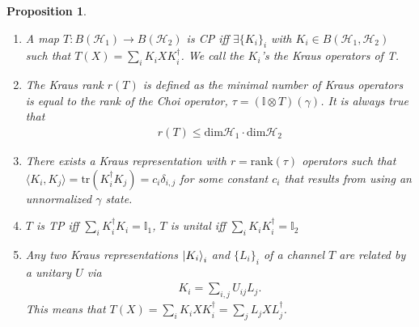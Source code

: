 \documentclass[10pt,oneside,longbibliography]{report}
\newtheorem{proposition}{Proposition}[section]
\begin{document}
\begin{proposition}
\begin{enumerate}
    \item A map $T:B(\mathcal{H}_1)\rightarrow B(\mathcal{H}_2)$ is CP iff $\exists \{K_i\}_i$ with $K_i \in B(\mathcal{H}_1,\mathcal{H}_2)$ such that $T(X) = \sum_i K_i X K_i^{\dagger}$. We call the $K_i$'s the Kraus operators of T. 
    \item The Kraus rank $r(T)$ is defined as the minimal number of Kraus operators is equal to the rank of the Choi operator, $\tau = (\mathbb{I}\otimes T)(\gamma)$. It is always true that 
    \begin{align}
        r(T) \leq \text{dim}\mathcal{H}_1\cdot\text{dim}\mathcal{H}_2
    \end{align}
    \item There exists a Kraus representation with $r=\text{rank}(\tau)$ operators such that $\langle K_i,K_j\rangle=\text{tr}(K_i^{\dagger} K_j) = c_i \delta_{i,j}$ for some constant $c_i$ that results from using an unnormalized $\gamma$ state. 
    \item $T$ is TP iff $\sum_i K_i^{\dagger}K_i = \mathbb{I}_1$, $T$ is unital iff $\sum_i K_i K_i^{\dagger} = \mathbb{I}_2$
    \item Any two Kraus representations $\ket{K_i}_i$ and $\{L_i\}_i$ of a channel $T$ are related by a unitary $U$ via 
    \begin{align}
        K_i = \sum_{i,j} U_{ij}L_j.
    \end{align}
    This means that $T(X)=\sum_i K_i X K_i^{\dagger} = \sum_j L_j X L_j^{\dagger}$.
\end{enumerate}
\end{proposition}
\end{document}
